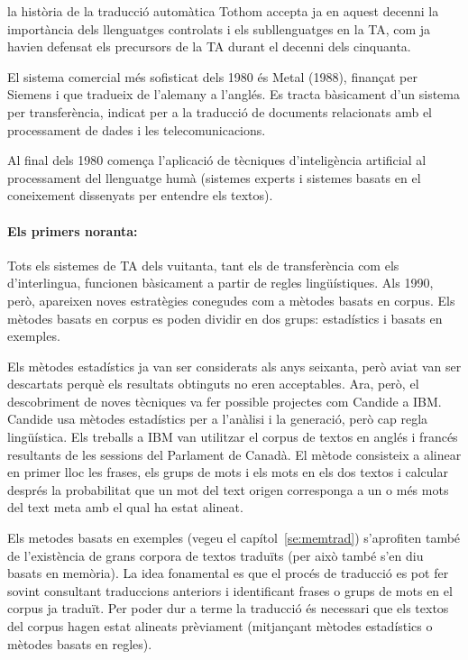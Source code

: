 \begin{persabermes}{la història de la traducció automàtica}
Tothom accepta ja en aquest decenni la importància dels llenguatges
controlats i els subllenguatges en la TA, com ja havien defensat els
precursors de la TA durant el decenni dels cinquanta.

El sistema comercial més sofisticat dels 1980 és Metal (1988),
finançat per Siemens i que tradueix de l'alemany a l'anglés.  Es
tracta bàsicament d'un sistema per transferència, indicat per a la
traducció de documents relacionats amb el processament de dades i les
telecomunicacions.

Al final dels 1980 comença l'aplicació de tècniques d'inteligència
artificial al processament del llenguatge humà (sistemes experts i
sistemes basats en el coneixement dissenyats per entendre els textos).

\paragraph{Els primers noranta:} Tots els sistemes de TA dels
vuitanta, tant els de transferència com els d'interlingua, funcionen
bàsicament a partir de regles lingüístiques. Als 1990, però, apareixen
noves estratègies conegudes com a mètodes basats en corpus. Els
mètodes basats en corpus es poden dividir en dos grups: estadístics i
basats en exemples.

Els mètodes estadístics ja van ser considerats als anys seixanta, però
aviat van ser descartats perquè els resultats obtinguts no eren
acceptables. Ara, però, el descobriment de noves tècniques va fer
possible projectes com Candide a IBM. Candide usa mètodes estadístics
per a l'anàlisi i la generació, però cap regla lingüística. Els
treballs a IBM van utilitzar el corpus de textos en anglés i francés
resultants de les sessions del Parlament de Canadà.  El mètode
consisteix a alinear en primer lloc les frases, els grups de mots i
els mots en els dos textos i calcular després la probabilitat que un
mot del text origen corresponga a un o més mots del text meta amb el
qual ha estat alineat.

Els metodes basats en exemples (vegeu el capítol~\ref{se:memtrad})
s'aprofiten també de l'existència de grans corpora de textos
traduïts (per això també s'en diu basats en memòria). La idea
fonamental es que el procés de traducció es pot fer sovint consultant
traduccions anteriors i identificant frases o grups de mots en el
corpus ja traduït. Per poder dur a terme la traducció és necessari que
els textos del corpus hagen estat alineats prèviament (mitjançant
mètodes estadístics o mètodes basats en regles).


\end{persabermes}
